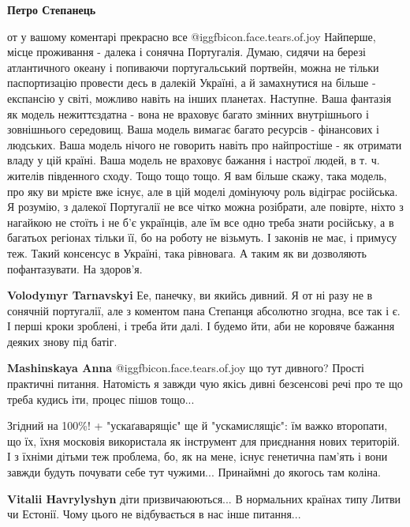 \begin{itemize}
\begin{itemize}
\textbf{Петро Степанець} 

от у вашому коментарі прекрасно все  @igg{fbicon.face.tears.of.joy}  Найперше, місце проживання - далека і
сонячна Португалія. Думаю, сидячи на березі атлантичного океану і попиваючи
португальський портвейн, можна не тільки паспортизацію провести десь в далекій
Україні, а й замахнутися на більше - експансію у світі, можливо навіть на інших
планетах. Наступне. Ваша фантазія як модель нежиттєздатна - вона не враховує
багато змінних внутрішнього і зовнішнього середовищ. Ваша модель вимагає багато
ресурсів - фінансових і людських. Ваша модель нічого не говорить навіть про
найпростіше - як отримати владу у цій країні. Ваша модель не враховує бажання і
настрої людей, в т. ч. жителів південного сходу. Тощо тощо тощо. Я вам більше
скажу, така модель, про яку ви мрієте вже існує, але в цій моделі домінуючу
роль відіграє російська. Я розумію, з далекої Португалії не все чітко можна
розібрати, але повірте, ніхто з нагайкою не стоїть і не б'є українців, але їм
все одно треба знати російську, а в багатьох регіонах тільки її, бо на роботу
не візьмуть. І законів не має, і примусу теж. Такий консенсус в Україні, така
рівновага. А таким як ви дозволяють пофантазувати. На здоров'я.


\textbf{Volodymyr Tarnavskyi} Ее, панечку, ви якийсь дивний. Я от ні разу не в сонячній португалії, але з коментом пана Степанця абсолютно згодна, все так і є. І перші кроки зроблені, і треба йти далі. І будемо йти, аби не коровяче бажання деяких знову під батіг.

\textbf{Mashinskaya Anna}  @igg{fbicon.face.tears.of.joy}  що тут дивного? Прості практичні питання. Натомість я завжди чую якісь дивні безсенсові речі про те що треба кудись іти, процес пішов тощо...
\end{itemize} %


Згідний на 100\%! + "ускаґаварящіє" ще й "ускамислящіє": їм важко второпати, що
їх, їхня московія використала як інструмент для приєднання нових територій. І з
їхніми дітьми теж проблема, бо, як на мене, існує генетична пам'ять і вони
завжди будуть почувати себе тут чужими... Принаймні до якогось там коліна.

\begin{itemize} %
\textbf{Vitalii Havrylyshyn} діти призвичаюються... В нормальних країнах типу Литви чи Естонії. Чому цього не відбувається в нас інше питання...


\end{itemize}
\end{itemize}

